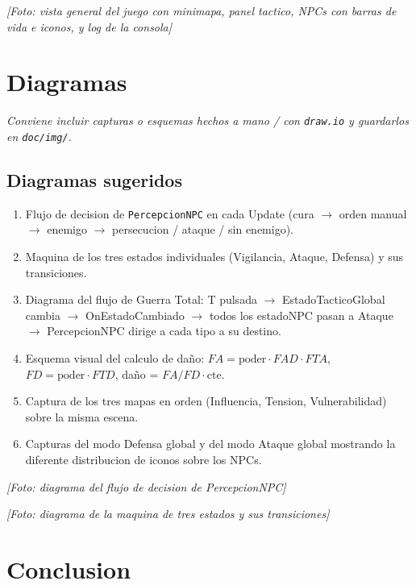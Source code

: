 \documentclass[12pt,a4paper]{article}
\newcommand{\fotoplaceholder}[1]{%
    \par\medskip\noindent%
    \begin{center}%
    \begin{tcolorbox}[
        colback=fotobg,
        colframe=fotoborder,
        boxrule=0.8pt,
        arc=2pt,
        width=0.85\textwidth,
        halign=center,
        valign=center,
        height=2.4cm
    ]
    \itshape\color{gray} [Foto: #1]
    \end{tcolorbox}%
    \end{center}\medskip%
}
\begin{document}
\fotoplaceholder{vista general del juego con minimapa, panel tactico, NPCs con barras de vida e iconos, y log de la consola}

\section{Diagramas}


\textit{Conviene incluir capturas o esquemas hechos a mano / con
\texttt{draw.io} y guardarlos en \texttt{doc/img/}.}

\subsection*{Diagramas sugeridos}

\begin{enumerate}[leftmargin=1.5em]
    \item Flujo de decision de \texttt{PercepcionNPC} en cada Update (cura $\to$ orden manual $\to$ enemigo $\to$ persecucion / ataque / sin enemigo).
    \item Maquina de los tres estados individuales (Vigilancia, Ataque, Defensa) y sus transiciones.
    \item Diagrama del flujo de Guerra Total: T pulsada $\to$ EstadoTacticoGlobal cambia $\to$ OnEstadoCambiado $\to$ todos los estadoNPC pasan a Ataque $\to$ PercepcionNPC dirige a cada tipo a su destino.
    \item Esquema visual del calculo de daño: $FA = \text{poder} \cdot FAD \cdot FTA$, $FD = \text{poder} \cdot FTD$, daño = $FA/FD \cdot \text{cte}$.
    \item Captura de los tres mapas en orden (Influencia, Tension, Vulnerabilidad) sobre la misma escena.
    \item Capturas del modo Defensa global y del modo Ataque global mostrando la diferente distribucion de iconos sobre los NPCs.
\end{enumerate}

\fotoplaceholder{diagrama del flujo de decision de PercepcionNPC}

\fotoplaceholder{diagrama de la maquina de tres estados y sus transiciones}

\newpage
\section{Conclusion}
\end{document}
